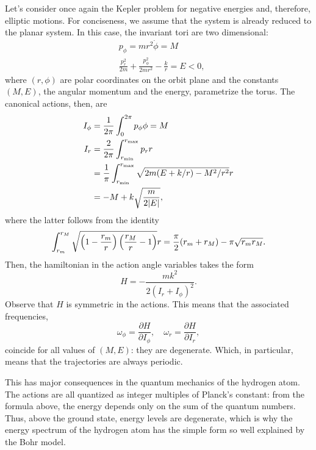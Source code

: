 \documentclass[english,fontsize=11pt,paper=a5,oneside]{scrbook}
\let\d\relax
\newcommand{\d}{\mathrm{d}}
\theoremstyle{definition}
\newenvironment{example}
  {\pushQED{\qed}\renewcommand{\qedsymbol}{$\lozenge$}\examplex}
  {\popQED\endexamplex}
\begin{document}
\begin{example}[Kepler problem -- elliptic motion]
  Let's consider once again the Kepler problem for negative energies and, therefore, elliptic motions.
  For conciseness, we assume that the system is already reduced to the planar system. In this case, the invariant tori are two dimensional:
  \begin{align}
     & p_\phi = m r^2 \dot \phi = M                                       \\
     & \frac{p_r^2}{2 m} + \frac{p_\phi^2}{2 m r^2} - \frac{k}{r} = E <0,
  \end{align}
  where $(r,\phi)$ are polar coordinates on the orbit plane and the constants $(M,E)$, the angular momentum and the energy, parametrize the torus.
  The canonical actions, then, are
  \begin{align}
    I_\phi & = \frac{1}{2\pi} \int_0^{2\pi} p_\phi \d \phi = M                                       \\
    I_r    & = \frac{2}{2\pi} \int_{r_{\mathrm{min}}}^{r_{\mathrm{max}}} p_r \d r                    \\
           & = \frac1\pi \int_{r_{\mathrm{min}}}^{r_{\mathrm{max}}} \sqrt{2m(E + k/r) - M^2/r^2}\d r \\
           & = - M + k \sqrt{\frac{m}{2|E|}},
  \end{align}
  where the latter follows from the identity
  \begin{equation}
    \int_{r_{m}}^{r_{M}} \sqrt{\left(1-\frac{r_m}r\right)\left(\frac{r_M}r-1\right)}\d r = \frac{\pi}2(r_m + r_M) - \pi \sqrt{r_m r_M}.
  \end{equation}
  Then, the hamiltonian in the action angle variables takes the form
  \begin{equation}
    H = - \frac{mk^2}{2(I_r + I_\phi)^2}.
  \end{equation}
  Observe that $H$ is symmetric in the actions. This means that the associated frequencies,
  \begin{equation}
    \omega_\phi = \frac{\partial H}{\partial I_\phi}, \quad
    \omega_r = \frac{\partial H}{\partial I_r},
  \end{equation}
  coincide for all values of $(M,E)$: they are degenerate. Which, in particular, means that the trajectories are always periodic.

  This has major consequences in the quantum mechanics of the hydrogen atom. The actions are all quantized as integer multiples of Planck's constant: from the formula above, the energy depends only on the sum of the quantum numbers. Thus, above the ground state, energy levels are degenerate, which is why the energy spectrum of the hydrogen atom has the simple form so well explained by the Bohr model.


\end{example}
\end{document}
